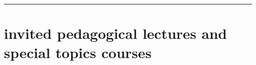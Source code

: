 \begin{itemize}[leftmargin=*]



\end{itemize}




\noindent\rule{\textwidth}{1pt}
\vspace{-1cm}
\section*{\sc  \color{Maroon}  invited pedagogical lectures and special topics courses}
\vspace{-.3cm}

